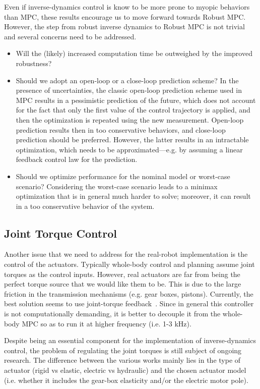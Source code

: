 Even if inverse-dynamics control is know to be more prone to myopic behaviors than MPC, these results encourage us to move forward towards Robust MPC.
However, the step from robust inverse dynamics to Robust MPC is not trivial and several concerns need to be addressed.
\begin{itemize}
\item Will the (likely) increased computation time be outweighed by the improved robustness?
\item Should we adopt an open-loop or a close-loop prediction scheme? In the presence of uncertainties, the classic open-loop prediction scheme used in MPC results in a pessimistic prediction of the future, which does not account for the fact that only the first value of the control trajectory is applied, and then the optimization is repeated using the new measurement. Open-loop prediction results then in too conservative behaviors, and close-loop prediction should be preferred. However, the latter results in an intractable optimization, which needs to be approximated---e.g. by assuming a linear feedback control law for the prediction.
\item Should we optimize performance for the nominal model or worst-case scenario? Considering the worst-case scenario leads to a minimax optimization that is in general much harder to solve; moreover, it can result in a too conservative behavior of the system.
\end{itemize}


\subsection{Joint Torque Control}
Another issue that we need to address for the real-robot implementation is the control of the actuators.
Typically whole-body control and planning assume joint torques as the control inputs.
However, real actuators are far from being the perfect torque source that we would like them to be.
This is due to the large friction in the transmission mechanisms (e.g. gear boxes, pistons).
Currently, the best solution seems to use joint-torque feedback~\citep{Albu-Schaffer2007, Boaventura2012b}.
Since in general this controller is not computationally demanding, it is better to decouple it from the whole-body MPC so as to run it at higher frequency (i.e. 1-3 kHz).

Despite being an essential component for the implementation of inverse-dynamics control, the problem of regulating the joint torques is still subject of ongoing research. The difference between the various works mainly lies in the type of actuator (rigid vs elastic, electric vs hydraulic) and the chosen actuator model (i.e. whether it includes the gear-box elasticity and/or the electric motor pole).

